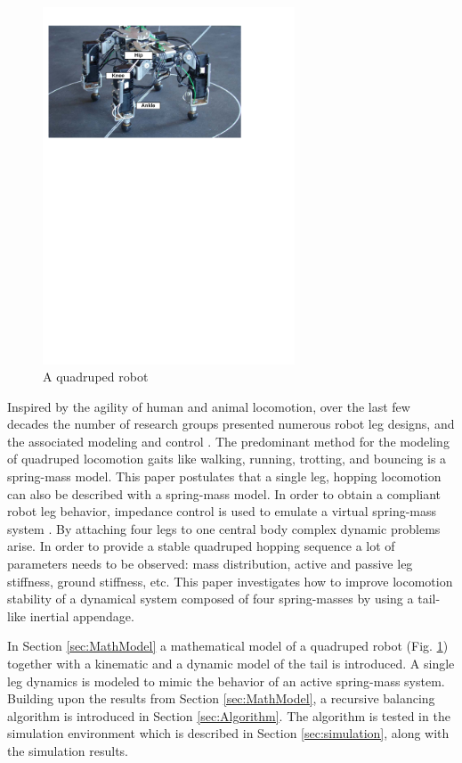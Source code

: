 \begin{figure}
                \centering
                \includegraphics[width=75mm]{./pictures/Dynarobin_introduction_image.pdf}
                \caption{A quadruped robot}
                \label{fig:Dynarobin}
\end{figure}
 
Inspired by the agility of human and animal locomotion, over the last few decades the number of research groups presented numerous robot leg designs, and the associated modeling and control \cite{CambridgeJournals:1345088}. The predominant method for the modeling of quadruped locomotion gaits like walking, running, trotting, and bouncing is a spring-mass model\cite{Blickhan01}. This paper postulates that a single leg, hopping locomotion can also be described with a spring-mass model. In order to obtain a compliant robot leg behavior, impedance control is used to emulate a virtual spring-mass system \cite{Havoutis01}. By attaching four legs to one central body complex dynamic problems arise. In order to provide a stable quadruped hopping sequence a lot of parameters needs to be observed: mass distribution, active and passive leg stiffness, ground stiffness, etc. This paper investigates how to improve locomotion stability of a dynamical system composed of four spring-masses by using a tail-like inertial appendage.
 
In Section \ref{sec:MathModel} a mathematical model of a quadruped robot (Fig. \ref{fig:Dynarobin}) together with a kinematic and a dynamic model of the tail is introduced. A single leg dynamics is modeled to mimic the behavior of an active spring-mass system. Building upon the results from Section \ref{sec:MathModel}, a recursive balancing algorithm is introduced in Section \ref{sec:Algorithm}. The algorithm is tested in the simulation environment which is described in Section \ref{sec:simulation}, along with the simulation results.




